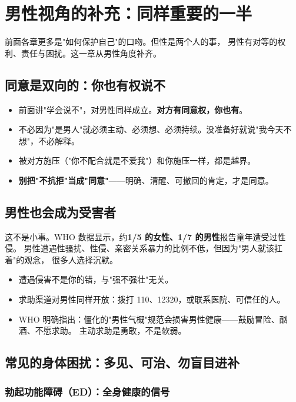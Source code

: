\documentclass[12pt,UTF8,openany]{ctexbook}
\begin{document}
\tableofcontents
\clearpage
\chapter{男性视角的补充：同样重要的一半}
\label{chap:male}

前面各章更多是"如何保护自己"的口吻。但性是两个人的事，
男性有对等的权利、责任与困扰。这一章从男性角度补齐。

\section{同意是双向的：你也有权说不}

\begin{itemize}[leftmargin=2em]
  \item 前面讲"学会说不"，对男性同样成立。\textbf{对方有同意权，你也有}。
  \item 不必因为"是男人"就必须主动、必须想、必须持续。没准备好就说"我今天不想"，不必解释。
  \item 被对方施压（"你不配合就是不爱我"）和你施压一样，都是越界。
  \item \textbf{别把"不抗拒"当成"同意"}——明确、清醒、可撤回的肯定，才是同意。
\end{itemize}

\section{男性也会成为受害者}

这不是小事。WHO 数据显示，约\textbf{1/5 的女性、1/7 的男性}报告童年遭受过性侵。
男性遭遇性骚扰、性侵、亲密关系暴力的比例不低，但因为"男人就该扛着"的观念，
很多人选择沉默。

\begin{itemize}[leftmargin=2em]
  \item 遭遇侵害不是你的错，与"强不强壮"无关。
  \item 求助渠道对男性同样开放：拨打 110、12320，或联系医院、可信任的人。
  \item WHO 明确指出：僵化的"男性气概"规范会损害男性健康——鼓励冒险、酗酒、不愿求助。
        主动求助是勇敢，不是软弱。
\end{itemize}

\section{常见的身体困扰：多见、可治、勿盲目进补}

\subsection*{勃起功能障碍（ED）：全身健康的信号}
\end{document}
